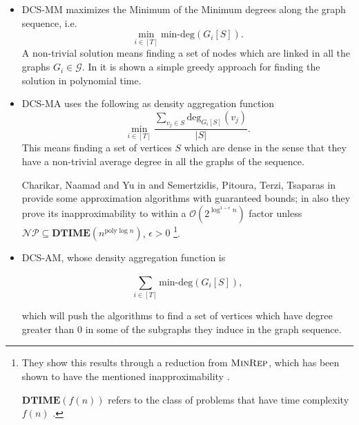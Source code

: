 \begin{itemize}
	\item \acrshort{DCS}-MM maximizes the Minimum of the Minimum degrees along
	      the graph sequence, i.e.
	      \begin{equation}
		      \label{eq:dcs-mm}
		      \min_{i \in [T]} \text{min-deg} (G_i[S]).
	      \end{equation}
	      A non-trivial solution means finding a set of nodes which are linked
	      in all the graphs $G_i \in \mathcal{G} $.
	      In \cite{semertzidis2019finding} it is shown a simple greedy approach
	      for finding the solution in polynomial time.
	\item \acrshort{DCS}-MA uses the following as density aggregation function
	      \begin{equation}
		      \label{eq:dcs-ma}
		      \min_{i \in [T]}
		      \frac{\sum^{}_{v_{j} \in S } \text{deg}_{G_i[S]} (v_{j} )}{|S|}.
	      \end{equation}
	      This means finding a set of vertices $S$ which are dense in the sense
	      that they have a non-trivial average degree in all the graphs of the
	      sequence.


	      Charikar, Naamad and Yu in \cite{charikar2018finding} and
	      Semertzidis, Pitoura, Terzi, Tsaparas in
	      \cite{semertzidis2019finding} provide some
	      approximation algorithms with guaranteed bounds;
	      in \cite{charikar2018finding} also they prove its
	      inapproximability to within a $\mathcal{O}(2 ^{\log^{1-\epsilon} n} )
	      $ factor unless $\mathcal{NP} \subseteq \mathbf{DTIME} (n
		      ^{\text{poly}\log n} ) $, $\epsilon > 0$
	      \footnote{They show this results through a reduction from
	      $\textsc{MinRep}$, which has been shown to have the mentioned
	      inapproximability \cite{charikar2018finding,kortsarz2001hardness}.

	      $ \mathbf{DTIME}(f(n)) $ refers to the class of problems that
	      have time complexity $f(n)$ \cite{9780521884730}.
	      }.
	\item \acrshort{DCS}-AM, whose density aggregation function is

	      \begin{equation}
		      \label{eq:dcs-am}
		      \sum^{}_{i \in [T]} \text{min-deg} (G_i [S]),
	      \end{equation}

	      which will push the algorithms to find a set of vertices which have
	      degree greater than $0$ in some of the subgraphs they induce in the
	      graph sequence.


\end{itemize}
